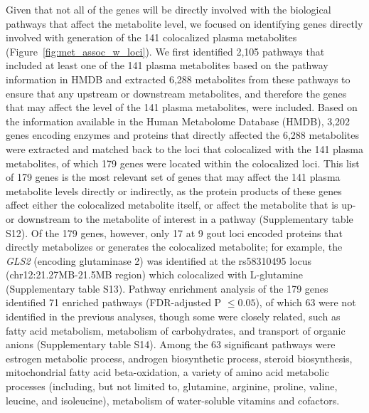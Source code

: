 \documentclass[gucdd,article,submit,pdftex,moreauthors]{Definitions/mdpi}
\begin{document}
Given that not all of the genes will be directly involved with the biological pathways that affect the metabolite level, we focused on identifying genes directly involved with generation of the 141 colocalized plasma metabolites (Figure~\ref{fig:met_assoc_w_loci}).
We first identified 2,105 pathways that included at least one of the 141 plasma metabolites based on the pathway information in HMDB and extracted 6,288 metabolites from these pathways to ensure that any upstream or downstream metabolites, and therefore the genes that may affect the level of the 141 plasma metabolites, were included.
Based on the information available in the Human Metabolome Database (HMDB), 3,202 genes encoding enzymes and proteins that directly affected the 6,288 metabolites were extracted and matched back to the loci that colocalized with the 141 plasma metabolites, of which 179 genes were located within the colocalized loci.
This list of 179 genes is the most relevant set of genes that may affect the 141 plasma metabolite levels directly or indirectly, as the protein products of these genes affect either the colocalized metabolite itself, or affect the metabolite that is up- or downstream to the metabolite of interest in a pathway (Supplementary table S12).
Of the 179 genes, however, only 17 at 9 gout loci encoded proteins that directly metabolizes or generates the colocalized metabolite; for example, the \textit{GLS2} (encoding glutaminase 2) was identified at the rs58310495 locus (chr12:21.27MB-21.5MB region) which colocalized with L-glutamine (Supplementary table S13).
Pathway enrichment analysis of the 179 genes identified 71 enriched pathways (FDR-adjusted P $\le 0.05$), of which 63 were not identified in the previous analyses, though some were closely related, such as fatty acid metabolism, metabolism of carbohydrates, and transport of organic anions (Supplementary table S14).
Among the 63 significant pathways were estrogen metabolic process, androgen biosynthetic process, steroid biosynthesis, mitochondrial fatty acid beta-oxidation, a variety of amino acid metabolic processes (including, but not limited to, glutamine, arginine, proline, valine, leucine, and isoleucine), metabolism of water-soluble vitamins and cofactors.
\end{document}
